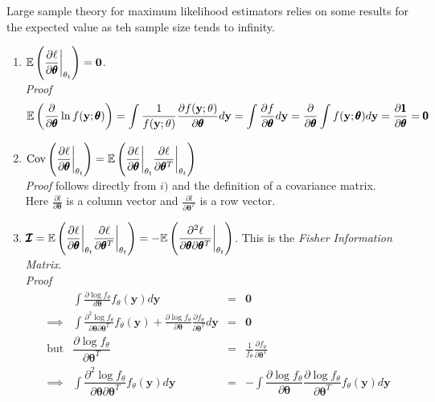 \documentclass[11pt,a4paper]{article}
\begin{document}
Large sample theory for maximum likelihood estimators relies on some results for the expected value as teh sample size tends to infinity.
\begin{enumerate}
	\item $\mathbb{E}\left(\dfrac{\partial\ell}{\partial\pmb\theta}\bigg|_{\theta_t}\right)=\textbf{0}$.\\
	\textit{Proof}
	$$\mathbb{E}\left(\frac\partial{\partial\pmb\theta}\ln f(\textbf{y};\pmb\theta)\right)=\int\frac{1}{f(\textbf{y};\theta)}\dfrac{\partial f(\textbf{y};\theta)}{\partial\pmb\theta}d\textbf{y}=\int\dfrac{\partial f}{\partial\pmb\theta}d\textbf{y}=\dfrac{\partial}{\partial\pmb\theta}\int f(\textbf{y};\pmb\theta)d\textbf{y}=\dfrac{\partial\pmb1}{\partial\pmb\theta}=\pmb0$$
	\item $\text{Cov}\left(\dfrac{\partial\ell}{\partial\pmb\theta}\bigg|_{\theta_t}\right)=\mathbb{E}\left(\dfrac{\partial\ell}{\partial\pmb\theta}\bigg|_{\theta_t}\dfrac{\partial\ell}{\partial\pmb\theta^T}\bigg|_{\theta_t}\right)$\\
	\textit{Proof} follows directly from $i)$ and the definition of a covariance matrix.\\
	\nb Here $\frac{\partial l}{\partial\pmb\theta}$ is a column vector and $\frac{\partial l}{\partial\pmb\theta^T}$ is a row vector.
	\item $\pmb{\mathcal{I}}=\mathbb{E}\left(\dfrac{\partial\ell}{\partial\pmb\theta}\bigg|_{\theta_t}\dfrac{\partial\ell}{\partial\pmb\theta^T}\bigg|_{\theta_t}\right)=-\mathbb{E}\left(\dfrac{\partial^2\ell}{\partial\pmb\theta\partial\pmb\theta^T}\bigg|_{\theta_t}\right)$. This is the \textit{Fisher Information Matrix}.\\
	\textit{Proof}\\
	\[\begin{array}{rrcl}
	&\displaystyle\int\frac{\partial\log f_\theta}{d\pmb\theta}f_\theta(\textbf{y})d\textbf{y}&=&\textbf{0}\\
	\implies&\displaystyle\int\frac{\partial^2\log f_\theta}{\partial\pmb\theta\partial\pmb\theta^T}f_\theta(\textbf{y})+\frac{\partial\log f_\theta}{\partial\pmb\theta}\frac{\partial f_\theta}{\partial\pmb\theta^T}d\textbf{y}&=&\pmb0\\
	\text{but}&\dfrac{\partial\log f_\theta}{\partial\pmb\theta^T}&=&\frac1{f_\theta}\frac{\partial f_\theta}{\partial\pmb\theta^T}\\
	\implies&\displaystyle\int\dfrac{\partial^2\log f_\theta}{\partial\pmb\theta\partial\pmb\theta^T}f_\theta(\textbf{y})d\textbf{y}&=&-\displaystyle\int\dfrac{\partial\log f_\theta}{\partial\pmb\theta}\dfrac{\partial\log f_\theta}{\partial\pmb\theta^T}f_\theta(\textbf{y})d\textbf{y}

\end{array}\]
\end{enumerate}
\end{document}
